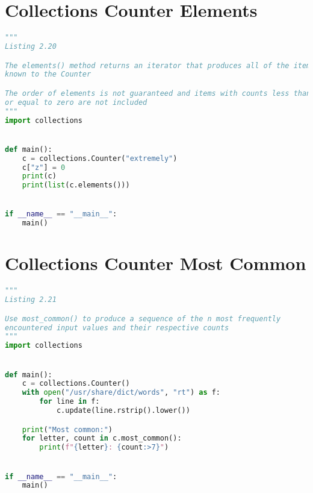 \documentclass[a4paper,landscape]{report}
\begin{document}
\section{Collections Counter Elements}
\begin{lstlisting}[language=Python]
"""
Listing 2.20

The elements() method returns an iterator that produces all of the items
known to the Counter

The order of elements is not guaranteed and items with counts less than
or equal to zero are not included
"""
import collections


def main():
    c = collections.Counter("extremely")
    c["z"] = 0
    print(c)
    print(list(c.elements()))


if __name__ == "__main__":
    main()

\end{lstlisting}
\section{Collections Counter Most Common}
\begin{lstlisting}[language=Python]
"""
Listing 2.21

Use most_common() to produce a sequence of the n most frequently
encountered input values and their respective counts
"""
import collections


def main():
    c = collections.Counter()
    with open("/usr/share/dict/words", "rt") as f:
        for line in f:
            c.update(line.rstrip().lower())

    print("Most common:")
    for letter, count in c.most_common():
        print(f"{letter}: {count:>7}")


if __name__ == "__main__":
    main()

\end{lstlisting}
\end{document}
